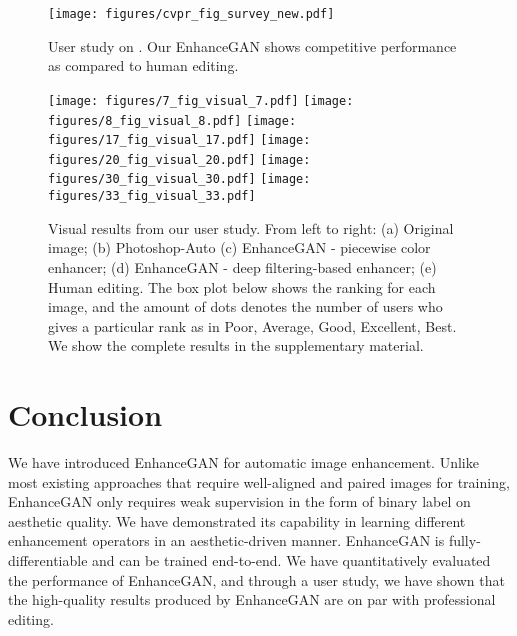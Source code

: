 \documentclass[sigconf]{acmart}
\begin{document}
\begin{figure}
\begin{center}
\texttt{[image: figures/cvpr\_fig\_survey\_new.pdf]}
\end{center}
\vskip -0.4cm
\caption{User study on . Our EnhanceGAN shows competitive performance as compared to human editing.}
\label{fig:userstudy}
\end{figure}
\begin{figure}[t]
\centering
\texttt{[image: figures/7\_fig\_visual\_7.pdf]}
\texttt{[image: figures/8\_fig\_visual\_8.pdf]}
\texttt{[image: figures/17\_fig\_visual\_17.pdf]}
\texttt{[image: figures/20\_fig\_visual\_20.pdf]}
\texttt{[image: figures/30\_fig\_visual\_30.pdf]}
\texttt{[image: figures/33\_fig\_visual\_33.pdf]}
\caption{Visual results from our user study. From left to right: (a) Original image; (b) Photoshop-Auto (c) EnhanceGAN - piecewise color enhancer; (d) EnhanceGAN - deep filtering-based enhancer; (e) Human editing. The box plot below shows the ranking for each image, and the amount of dots denotes the number of users who gives a particular rank as in Poor, Average, Good, Excellent, Best. We show the complete results in the supplementary material.}
\label{fig:visual_results}
\end{figure}


\section{Conclusion} 
We have introduced EnhanceGAN for automatic image enhancement. Unlike most existing approaches that require well-aligned and paired images for training, EnhanceGAN only requires weak supervision in the form of binary label on aesthetic quality. We have demonstrated its capability in learning different enhancement operators in an aesthetic-driven manner. 
EnhanceGAN is fully-differentiable and can be trained end-to-end.
We have quantitatively evaluated the performance of EnhanceGAN, and through a user study, we have shown that the high-quality results produced by EnhanceGAN are on par with professional editing.



\end{document}
